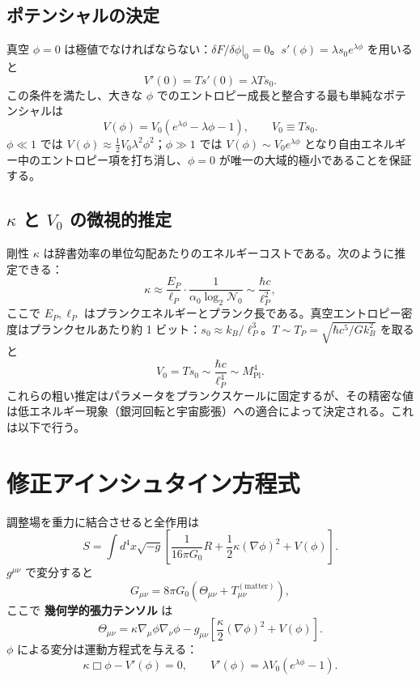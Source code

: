 \documentclass[12pt,a4paper]{article}
\begin{document}
	\subsection{ポテンシャルの決定}
	真空 \(\phi=0\) は極値でなければならない：\(\delta F/\delta\phi|_0 = 0\)。\(s'(\phi) = \lambda s_0 e^{\lambda\phi}\) を用いると
	\[
	V'(0) = T s'(0) = \lambda T s_0.
	\]
	この条件を満たし、大きな \(\phi\) でのエントロピー成長と整合する最も単純なポテンシャルは
	\begin{equation}
		\boxed{V(\phi) = V_0 \left( e^{\lambda\phi} - \lambda\phi - 1 \right), \qquad V_0 \equiv T s_0.}
		\label{eq:V}
	\end{equation}
	\(\phi \ll 1\) では \(V(\phi) \approx \frac12 V_0 \lambda^2 \phi^2\)；\(\phi \gg 1\) では \(V(\phi) \sim V_0 e^{\lambda\phi}\) となり自由エネルギー中のエントロピー項を打ち消し、\(\phi=0\) が唯一の大域的極小であることを保証する。
	
	\subsection{\(\kappa\) と \(V_0\) の微視的推定}
	剛性 \(\kappa\) は辞書効率の単位勾配あたりのエネルギーコストである。次のように推定できる：
	\[
	\kappa \approx \frac{E_P}{\ell_P} \cdot \frac{1}{\alpha_0 \log_2 \mathcal{N}_0} \sim \frac{\hbar c}{\ell_P^2},
	\]
	ここで \(E_P, \ell_P\) はプランクエネルギーとプランク長である。真空エントロピー密度はプランクセルあたり約 1 ビット：\(s_0 \approx k_B / \ell_P^3\)。\(T \sim T_P = \sqrt{\hbar c^5 / G k_B^2}\) を取ると
	\[
	V_0 = T s_0 \sim \frac{\hbar c}{\ell_P^4} \sim M_{\mathrm{Pl}}^4.
	\]
	これらの粗い推定はパラメータをプランクスケールに固定するが、その精密な値は低エネルギー現象（銀河回転と宇宙膨張）への適合によって決定される。これは以下で行う。
	
	\section{修正アインシュタイン方程式}
	
	調整場を重力に結合させると全作用は
	\begin{equation}
		S = \int d^4x \sqrt{-g} \left[ \frac{1}{16\pi G_0} R + \frac{1}{2}\kappa (\nabla\phi)^2 + V(\phi) \right].
		\label{eq:action}
	\end{equation}
	\(g^{\mu\nu}\) で変分すると
	\begin{equation}
		G_{\mu\nu} = 8\pi G_0 \left( \Theta_{\mu\nu} + T_{\mu\nu}^{(\mathrm{matter})} \right),
		\label{eq:einstein}
	\end{equation}
	ここで \textbf{幾何学的張力テンソル} は
	\begin{equation}
		\Theta_{\mu\nu} = \kappa \nabla_\mu \phi \nabla_\nu \phi - g_{\mu\nu} \left[ \frac{\kappa}{2} (\nabla\phi)^2 + V(\phi) \right].
		\label{eq:Theta}
	\end{equation}
	\(\phi\) による変分は運動方程式を与える：
	\begin{equation}
		\kappa \Box \phi - V'(\phi) = 0, \qquad V'(\phi) = \lambda V_0 \left( e^{\lambda\phi} - 1 \right).
		\label{eq:phieom}
	\end{equation}
	
\end{document}

